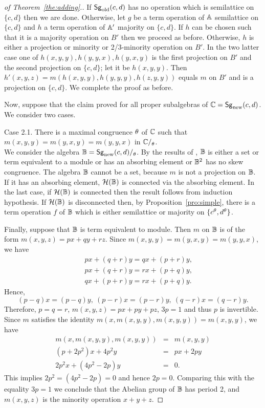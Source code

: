 \documentclass[11pt]{article}
\begin{document}
\begin{proof}[of Theorem~\ref{the:adding}.]
If ${\sf Sg}_{\mathrm{old}}(c,d)$ has no
operation which is semilattice on $\{c,d\}$ then we are
done. Otherwise, let $g$ be a term operation of ${\mathbb A}$ semilattice on
$\{c,d\}$ and $h$ a term operation of ${\mathbb A}'$ majority on
$\{c,d\}$. If $h$ can be chosen such that it is a majority
operation on $B'$ then we
proceed as before. Otherwise, $h$ is either a projection or minority
or 2/3-minority operation on
$B'$. In the two latter case
one of $h(x,y,y),h(y,y,x),h(y,x,y)$ is the first projection on
$B'$ and the second
projection on $\{c,d\}$; let it be $h(x,y,y)$. 
Then $h'(x,y,z)=m(h(x,y,y),h(y,y,y),h(z,y,y))$ equals $m$ on
$B'$ and is a projection on
$\{c,d\}$. We complete the proof as before.
\medskip

Now, suppose that the claim proved for all proper subalgebras of
${\mathbb C}={\sf Sg}_{\mathrm{new}}(c,d)$. We consider two cases.
\medskip

\noindent
{\sc Case 2.1.} There is a maximal congruence $\theta$ of
${\mathbb C}$ such that $m(x,y,y)=m(y,x,y)=m(y,y,x)$ in $\zC\fac\th$.\\[2mm]
We consider the algebra $\zB=\Sgn{c,d}\fac\th$. By the results of
\cite{Kearnes96:idempotent}, ${\mathbb B}$ is either a set or term equivalent
to a module or has an absorbing element or ${\mathbb B}^2$ has no skew
congruence. The algebra ${\mathbb B}$ cannot be a set, because $m$ is not a
projection on ${\mathbb B}$. If it has an absorbing element, ${\mathcal H}({\mathbb B})$ is
connected via the absorbing element. In the last case, if ${\mathcal H}({\mathbb B})$
is connected then the result follows from induction hypothesis. If
${\mathcal H}({\mathbb B})$ is disconnected then, by Proposition~\ref{pro:simple},
there is a term operation $f$ of ${\mathbb B}$ which is either semilattice or
majority on $\{c^\theta,d^\theta\}$.

Finally, suppose that ${\mathbb B}$ is term equivalent to module. Then $m$ on
${\mathbb B}$ is of the form $m(x,y,z)=px+qy+rz$. Since
$m(x,y,y)=m(y,x,y)=m(y,y,x)$, we have
\begin{eqnarray*}
&& px+(q+r)y=qx+(p+r)y,\\
&& px+(q+r)y=rx+(p+q)y,\\
&& qx+(p+r)y=rx+(p+q)y.
\end{eqnarray*}
Hence,
$$
(p-q)x=(p-q)y,\ (p-r)x=(p-r)y,\ (q-r)x=(q-r)y.
$$
Therefore, $p=q=r$, $m(x,y,z)=px+py+pz$, $3p=1$ and thus $p$ is
invertible. Since $m$ satisfies the identity
$m(x,m(x,y,y),m(x,y,y))=m(x,y,y)$, we have 
\begin{eqnarray*}
m(x,m(x,y,y),m(x,y,y))&=&m(x,y,y)\\
(p+2p^2)x+4p^2y &=& px+2py\\
2p^2x+(4p^2-2p)y &=& 0.
\end{eqnarray*}
This implies $2p^2=(4p^2-2p)=0$ and hence $2p=0$. Comparing this with
the equality $3p=1$ we conclude that the Abelian group of ${\mathbb B}$ has period 2, and
$m(x,y,z)$ is the minority operation $x+y+z$.


\end{proof}
\end{document}
